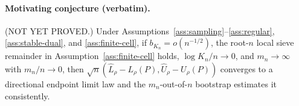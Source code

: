 \begin{theorem}\label{thm:inference}\label{prop:inference}
\paragraph{Motivating conjecture (verbatim).}
(NOT YET PROVED.)  Under Assumptions~\ref{ass:sampling}--\ref{ass:regular}, \ref{ass:stable-dual}, and \ref{ass:finite-cell}, if \(b_{K_n}=o(n^{-1/2})\), the root-\(n\) local sieve remainder in Assumption~\ref{ass:finite-cell} holds, \(\log K_n/n\to0\), and \(m_n\to\infty\) with \(m_n/n\to0\), then \(\sqrt n(\widehat L_\rho-L_\rho(P),\widehat U_\rho-U_\rho(P))\) converges to a directional endpoint limit law and the \(m_n\)-out-of-\(n\) bootstrap estimates it consistently.


\end{theorem}
